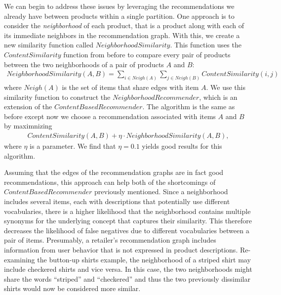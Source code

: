 \documentclass[11pt]{article}
\begin{document}
We can begin to address these issues by leveraging the recommendations we
already have between products within a single partition. One approach is to
consider the {\em neighborhood} of each product, that is a product along with
each of its immediate neighbors in the recommendation graph. With this, we
create a new similarity function called $NeighborhoodSimilarity$. This function
uses the $ContentSimilarity$ function from before to compare every pair of
products between the two neighborhoods of a pair of products $A$ and $B$:
\begin{align}
NeighborhoodSimilarity(A, B) = \sum\limits_{i\in
Neigh(A)}\sum\limits_{j\in Neigh(B)}
ContentSimilarity(i, j) 
\end{align}
where $Neigh(A)$ is the set of items that share edges with item $A$. We use this
similarity function to construct the $NeighborhoodRecommender$, which is
an extension of the $ContentBasedRecommender$. The algorithm is the same as
before except now we choose a recommendation associated with items $A$ and $B$
by maximnizing
\begin{align}
ContentSimilarity(A,B) + \eta \cdot NeighborhoodSimilarity(A, B),
\end{align}
where $\eta$ is a parameter. We find that $\eta = 0.1$ yields good results for
this algorithm.

Assuming that the edges of the recommendation graphs are in fact good
recommendations, this approach can help both of the shortcomings of
$ContentBasedRecommender$ previously mentioned. Since a neighborhood includes
several items, each with descriptions that potentially use different
vocabularies, there is a higher likelihood that the neighborhood contains
multiple synonyms for the underlying concept that captures their similarity.
This therefore decreases the likelihood of false negatives due to different
vocabularies between a pair of items. Presumably, a retailer's recommendation
graph includes information from user behavior that is not expressed in product
descriptions. Re-examining the button-up shirts example, the neighborhood of a
striped shirt may include checkered shirts and vice versa.  In this case, the
two neighborhoods might share the words ``striped'' and ``checkered'' and thus
the two previously dissimilar shirts would now be considered more similar.
\end{document}
